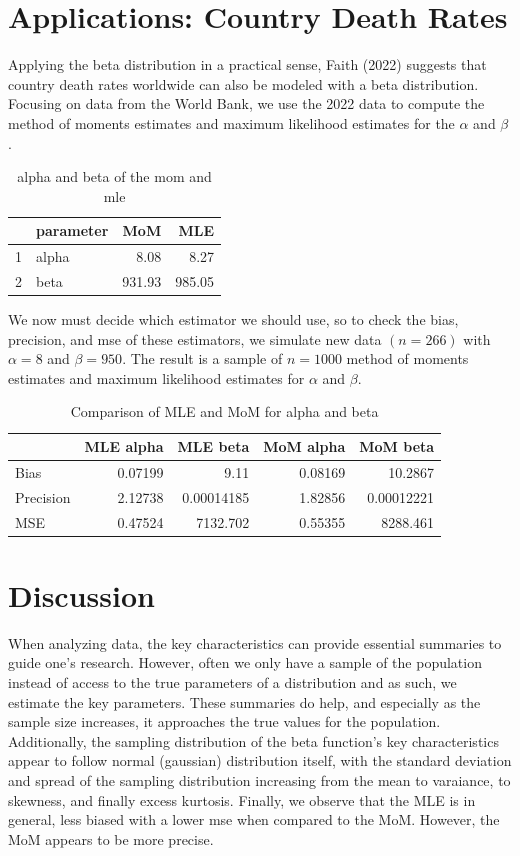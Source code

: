 \documentclass{article}\usepackage[]{graphicx}\usepackage[]{xcolor}
\begin{document}
\begin{multicols}{2}
\section{Applications: Country Death Rates}
Applying the beta distribution in a practical sense, Faith (2022) suggests that country death rates worldwide can also be modeled with a beta distribution. Focusing on data from the World Bank, we use the 2022 data to compute the method of moments estimates and maximum likelihood estimates for the $\alpha$ and $\beta$. 
\begin{table}[H]  %
\centering
\begin{tabular}{rlrr}
  \hline
   & parameter & MoM & MLE \\ 
  \hline
  1 & alpha & 8.08 & 8.27 \\ 
  2 & beta  & 931.93 & 985.05 \\ 
  \hline
\end{tabular}
\caption{alpha and beta of the mom and mle}  
\end{table}

We now must decide which estimator we should use, so to check the bias, precision, and mse of these estimators, we simulate new data $(n = 266)$ with $\alpha = 8$ and $\beta = 950$. The result is a sample of $n = 1000$ method of moments estimates and maximum likelihood estimates for $\alpha$ and $\beta$. 
\begin{table}[H]
\centering
\begin{tabular}{|l|r|r|r|r|}
  \hline
  & MLE alpha & MLE beta & MoM alpha & MoM beta \\ 
  \hline
  Bias & 0.07199 & 9.11 & 0.08169 & 10.2867 \\ 
  Precision & 2.12738 & 0.00014185 & 1.82856 & 0.00012221 \\ 
  MSE & 0.47524 & 7132.702 & 0.55355 & 8288.461 \\ 
  \hline
\end{tabular}
\caption{Comparison of MLE and MoM for alpha and beta}
\end{table}

\section{Discussion}
When analyzing data, the key characteristics can provide essential summaries to guide one's research. However, often we only have a sample of the population instead of access to the true parameters of a distribution and as such, we estimate the key parameters. These summaries do help, and especially as the sample size increases, it approaches the true values for the population. Additionally, the sampling distribution of the beta function's key characteristics appear to follow normal (gaussian) distribution itself, with the standard deviation and spread of the sampling distribution increasing from the mean to varaiance, to skewness, and finally excess kurtosis. Finally, we observe that the MLE is in general, less biased with a lower mse when compared to the MoM. However, the MoM appears to be more precise. 


\end{multicols}
\end{document}
